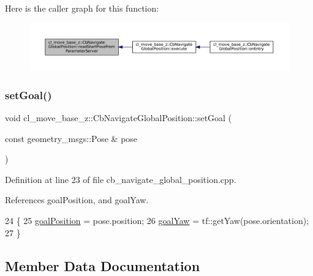 Here is the caller graph for this function\+:
\nopagebreak
\begin{figure}[H]
\begin{center}
\leavevmode
\includegraphics[width=350pt]{classcl__move__base__z_1_1CbNavigateGlobalPosition_a868b25f238e3781c9a2e44b4e1502fcc_icgraph}
\end{center}
\end{figure}
\mbox{\label{classcl__move__base__z_1_1CbNavigateGlobalPosition_a3dc6072628c1e1cdded3d574b3a9766e}} 
\subsubsection{\texorpdfstring{set\+Goal()}{setGoal()}}
{\footnotesize\ttfamily void cl\+\_\+move\+\_\+base\+\_\+z\+::\+Cb\+Navigate\+Global\+Position\+::set\+Goal (\begin{DoxyParamCaption}\item[{const geometry\+\_\+msgs\+::\+Pose \&}]{pose }\end{DoxyParamCaption})}



Definition at line 23 of file cb\+\_\+navigate\+\_\+global\+\_\+position.\+cpp.



References goal\+Position, and goal\+Yaw.


\begin{DoxyCode}
24 \{
25   \hyperlink{classcl__move__base__z_1_1CbNavigateGlobalPosition_a51a0266fd9a63e99f26e88933529c559}{goalPosition} = pose.position;
26   \hyperlink{classcl__move__base__z_1_1CbNavigateGlobalPosition_a839900de7f664b27c9be189fadbaa003}{goalYaw} = tf::getYaw(pose.orientation);
27 \}
\end{DoxyCode}


\subsection{Member Data Documentation}
\mbox{\label{classcl__move__base__z_1_1CbNavigateGlobalPosition_a51a0266fd9a63e99f26e88933529c559}} 
